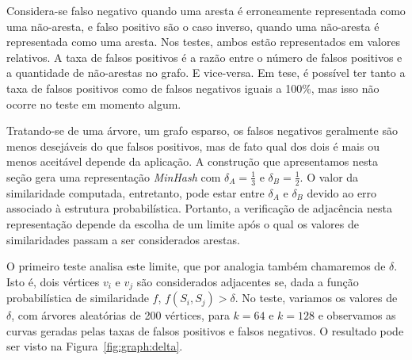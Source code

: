 Considera-se falso negativo quando uma aresta é erroneamente representada como uma não-aresta, e falso positivo são o caso inverso, quando uma não-aresta é representada como uma aresta. Nos testes, ambos estão representados em valores relativos. A taxa de falsos positivos é a razão entre o número de falsos positivos e a quantidade de não-arestas no grafo. E vice-versa. Em tese, é possível ter tanto a taxa de falsos positivos como de falsos negativos iguais a 100\%, mas isso não ocorre no teste em momento algum.

Tratando-se de uma árvore, um grafo esparso, os falsos negativos geralmente são menos desejáveis do que falsos positivos, mas de fato qual dos dois é mais ou menos aceitável depende da aplicação. A construção que apresentamos nesta seção gera uma representação \emph{MinHash} com $\delta_A = \frac{1}{3}$ e $\delta_B = \frac{1}{2}$. O valor da similaridade computada, entretanto, pode estar entre $\delta_A$ e $\delta_B$ devido ao erro associado à estrutura probabilística. Portanto, a verificação de adjacência nesta representação depende da escolha de um limite após o qual os valores de similaridades passam a ser considerados arestas.

O primeiro teste analisa este limite, que por analogia também chamaremos de $\delta$. Isto é, dois vértices $v_i$ e $v_j$ são considerados adjacentes se, dada a função probabilística de similaridade $f$, $f(S_i, S_j) > \delta$. No teste, variamos os valores de $\delta$, com árvores aleatórias de 200 vértices, para $k=64$ e $k=128$ e observamos as curvas geradas pelas taxas de falsos positivos e falsos negativos. O resultado pode ser visto na Figura~\ref{fig:graph:delta}.


